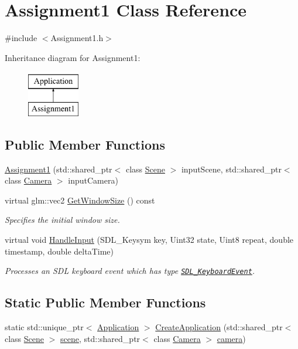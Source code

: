\hypertarget{class_assignment1}{}\section{Assignment1 Class Reference}
\label{class_assignment1}


{\ttfamily \#include $<$Assignment1.\+h$>$}

Inheritance diagram for Assignment1\+:\begin{figure}[H]
\begin{center}
\leavevmode
\includegraphics[height=2.000000cm]{class_assignment1}
\end{center}
\end{figure}
\subsection*{Public Member Functions}
\begin{DoxyCompactItemize}
\item
\hyperlink{class_assignment1_ade9ef18c233dab37d37f20760fe7674d}{Assignment1} (std\+::shared\+\_\+ptr$<$ class \hyperlink{class_scene}{Scene} $>$ input\+Scene, std\+::shared\+\_\+ptr$<$ class \hyperlink{class_camera}{Camera} $>$ input\+Camera)
\item
virtual glm\+::vec2 \hyperlink{class_assignment1_a581b6c897c918eede3f9bbb1cbc50320}{Get\+Window\+Size} () const
\begin{DoxyCompactList}\small\item\em Specifies the initial window size. \end{DoxyCompactList}\item
virtual void \hyperlink{class_assignment1_ab9db4f51e177dd72130cd61d86b97535}{Handle\+Input} (S\+D\+L\+\_\+\+Keysym key, Uint32 state, Uint8 repeat, double timestamp, double delta\+Time)
\begin{DoxyCompactList}\small\item\em Processes an S\+DL keyboard event which has type \href{https://wiki.libsdl.org/SDL_KeyboardEvent}{\tt S\+D\+L\+\_\+\+Keyboard\+Event}. \end{DoxyCompactList}\end{DoxyCompactItemize}
\subsection*{Static Public Member Functions}
\begin{DoxyCompactItemize}
\item
static std\+::unique\+\_\+ptr$<$ \hyperlink{class_application}{Application} $>$ \hyperlink{class_assignment1_ae1952b4904620a16c4f2c098bf061c68}{Create\+Application} (std\+::shared\+\_\+ptr$<$ class \hyperlink{class_scene}{Scene} $>$ \hyperlink{class_application_a88c6615107a5094bb93fa5f153f79554}{scene}, std\+::shared\+\_\+ptr$<$ class \hyperlink{class_camera}{Camera} $>$ \hyperlink{class_application_a0e8589fcb13c520ba472473abe5a518d}{camera})
\end{DoxyCompactItemize}
